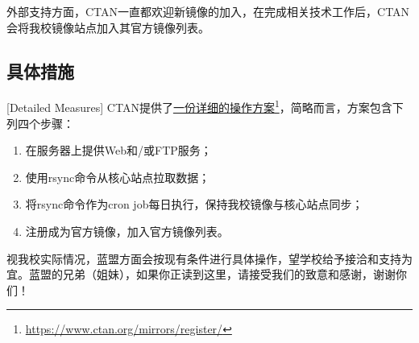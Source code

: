 外部支持方面，CTAN一直都欢迎新镜像的加入，在完成相关技术工作后，CTAN会将我校镜像站点加入其官方镜像列表。

\subsection{具体措施}[Detailed Measures]
CTAN提供了\href{https://www.ctan.org/mirrors/register/}{一份详细的操作方案}\footnote{\url{https://www.ctan.org/mirrors/register/}}，简略而言，方案包含下列四个步骤：
\begin{enumerate}
	\item 在服务器上提供Web和/或FTP服务；
	\item 使用rsync命令从核心站点拉取数据；
	\item 将rsync命令作为cron job每日执行，保持我校镜像与核心站点同步；
	\item 注册成为官方镜像，加入官方镜像列表。
\end{enumerate}

视我校实际情况，蓝盟方面会按现有条件进行具体操作，望学校给予接洽和支持为宜。蓝盟的兄弟（姐妹），如果你正读到这里，请接受我们的致意和感谢，谢谢你们！